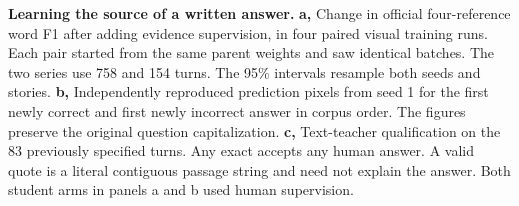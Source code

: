 \textbf{Learning the source of a written answer.} \textbf{a,} Change in official four-reference word F1 after adding evidence supervision, in four paired visual training runs. Each pair started from the same parent weights and saw identical batches. The two series use 758 and 154 turns. The 95\% intervals resample both seeds and stories. \textbf{b,} Independently reproduced prediction pixels from seed 1 for the first newly correct and first newly incorrect answer in corpus order. The figures preserve the original question capitalization. \textbf{c,} Text-teacher qualification on the 83 previously specified turns. Any exact accepts any human answer. A valid quote is a literal contiguous passage string and need not explain the answer. Both student arms in panels a and b used human supervision.

